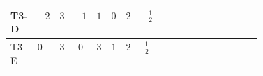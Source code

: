 \documentclass[8pt]{article}
\begin{document}
\begin{landscape}
\begin{longtable}{@{}llcccccc >{\raggedright\arraybackslash}p{0.21\linewidth} >{\raggedright\arraybackslash}p{0.21\linewidth}@{}}
\midrule
T3-D & $-2$ & $3$ & $-1$ & $1$ & $0$ & $2$ & $-\frac{1}{2}$ & \scriptsize\adjustbox{max width=\linewidth}{$\begin{gathered} 6 C_{5} yd \overline{yd}\end{gathered}$} & \scriptsize\adjustbox{max width=\linewidth}{$\begin{gathered} 6 C_{5} yu \overline{yu}\end{gathered}$} \\
\midrule
T3-E & $0$ & $3$ & $0$ & $3$ & $1$ & $2$ & $\frac{1}{2}$ & \scriptsize\adjustbox{max width=\linewidth}{$\begin{gathered} 6 C_{5} yd \overline{yd}\end{gathered}$} & \scriptsize\adjustbox{max width=\linewidth}{$\begin{gathered} 6 C_{5} yu \overline{yu}\end{gathered}$} \\
\midrule
\bottomrule
\end{longtable}
\end{landscape}
\end{document}
